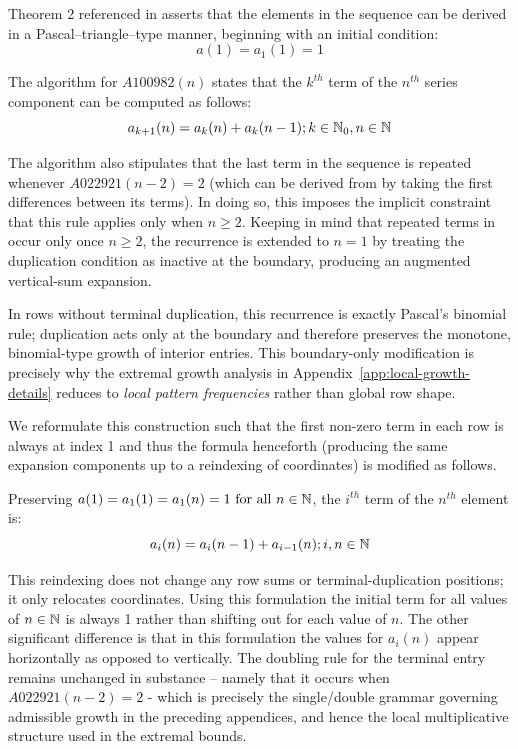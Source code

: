 \documentclass[12pt, oneside]{article}   	%
\numberwithin{equation}{section}          %
\theoremstyle{definition}
\begin{document}
Theorem 2 \cite{Winkler2017} referenced in  asserts that the elements in the
sequence can be derived in a Pascal–triangle–type manner, beginning with an initial condition:
\[
a(1) = a_1(1) = 1
\]

The algorithm for $A100982(n)$ states that the $k^{th}$ term of the $n^{th}$ series component
can be computed as follows:
\[
a_{k+1}(n) = a_k(n) + a_k(n-1); k \in \mathbb{N}_0, n \in \mathbb{N}
\]

The algorithm also stipulates that the last term in the sequence is repeated whenever
$A022921(n-2)=2$ (which can be derived from  by taking the first
differences between its terms).  In doing so, this imposes the implicit constraint that this rule
applies only when $n \ge 2$.  Keeping in mind that repeated terms in 
occur only once $n \ge 2$, the recurrence is extended to $n=1$ by treating the duplication
condition as inactive at the boundary, producing an augmented vertical-sum expansion.

In rows without terminal duplication, this recurrence is exactly Pascal’s binomial rule; duplication acts
only at the boundary and therefore preserves the monotone, binomial-type growth of interior entries.
This boundary-only modification is precisely why the extremal growth analysis in
Appendix~\ref{app:local-growth-details} reduces to \emph{local pattern frequencies}
rather than global row shape.

We reformulate this construction such that the first non-zero term in
each row is always at index 1 and thus the formula henceforth (producing the same expansion
components up to a reindexing of coordinates) is modified as follows.

Preserving $a(1) = a_1(1) = a_1(n) = 1 \text{ for all } n\in\mathbb{N}$, the $i^{th}$ term of the
$n^{th}$  element is:
\[
a_{i}(n) = a_i(n-1) + a_{i-1}(n); i,n \in \mathbb{N}
\]

This reindexing does not change any row sums or terminal-duplication positions; it only relocates coordinates.
Using this formulation the initial term for all values of $n \in \mathbb{N}$ is always 1 rather than
shifting out for each value of $n$.  The other significant difference is that in this formulation
the values for $a_i(n)$ appear horizontally as opposed to vertically.  The doubling rule for the
terminal entry remains unchanged in substance – namely that it occurs when $A022921(n-2) = 2$ -
which is precisely the single/double grammar governing admissible growth in the preceding appendices,
and hence the local multiplicative structure used in the extremal bounds.
\end{document}
